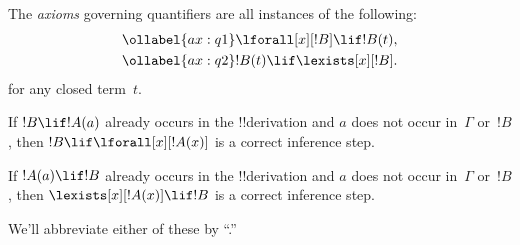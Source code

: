 \documentclass[../../../include/open-logic-section]{subfiles}
\begin{document}

\begin{defn}
The \emph{axioms} governing quantifiers are
all instances of the following:
\begin{align}
\ollabel{ax:q1} & \lforall[x][!B] \lif !B(t), \\
\ollabel{ax:q2} & !B(t) \lif \lexists[x][!B].
\end{align}
for any closed term~$t$.
\end{defn}

\begin{defn}
\item If $!B \lif !A(a)$ already occurs in the !!{derivation} and $a$
  does not occur in~$\Gamma$ or~$!B$, then $!B \lif
  \lforall[x][!A(x)]$ is a correct inference step.
\item If $!A(a) \lif !B$ already occurs in the !!{derivation} and $a$
  does not occur in~$\Gamma$ or~$!B$, then $\lexists[x][!A(x)] \lif
  !B$ is a correct inference step.
\end{defn}

We'll abbreviate either of these by ``\QR.''
\end{document}
